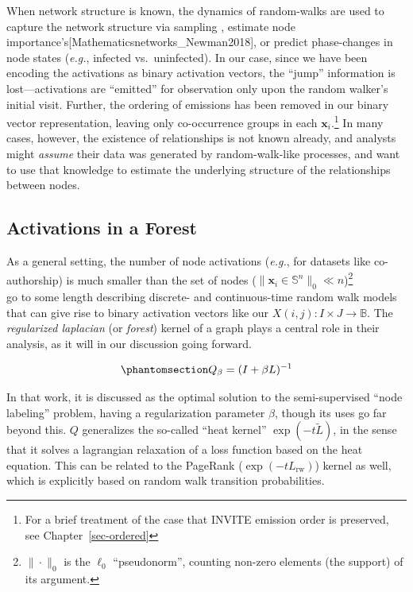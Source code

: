 \documentclass[%
	12pt,
		oneside,
		letterpaper
]{book}
\begin{document}
When network structure is known, the dynamics of random-walks are used
to capture the network structure via sampling
\autocite{LittleBallFur_Rozemberczki2020}, estimate node
importance's{[}Mathematicsnetworks\_Newman2018{]}, or predict
phase-changes in node states (\emph{e.g.}, infected
vs.~uninfected)\autocite{StructureFunctionComplex_Newman2003}. In our
case, since we have been encoding the activations as binary activation
vectors, the ``jump'' information is lost---activations are ``emitted''
for observation only upon the random walker's initial
visit.\autocite{Humanmemorysearch_Jun2015} Further, the ordering of
emissions has been removed in our binary vector representation, leaving
only co-occurrence groups in each \(\mathbf{x}_i\).\footnote{For a brief
  treatment of the case that INVITE emission order is preserved, see
  Chapter~\ref{sec-ordered}} In many cases, however, the existence of
relationships is not known already, and analysts might \emph{assume}
their data was generated by random-walk-like processes, and want to use
that knowledge to estimate the underlying structure of the relationships
between nodes.

\subsection{Activations in a Forest}\label{activations-in-a-forest}

As a general setting, the number of node activations (\emph{e.g.}, for
datasets like co-authorship) is much smaller than the set of nodes
(\(\|\mathbf{x}_i\in\mathbb{S}^n\|_0 \ll n\))\footnote{ \(\|\cdot\|_0\)
  is the \(\ell_0\) ``pseudonorm'', counting non-zero elements (the
  support) of its argument.}\\
\textcite{Semisupervisedlearning_Avrachenkov2017} go to some length
describing discrete- and continuous-time random walk models that can
give rise to binary activation vectors like our
\(X(i,j):I\times J\rightarrow \mathbb{B}\). The \emph{regularized
laplacian} (or \emph{forest}) kernel of a
graph\autocite{SimilaritiesgraphsKernels_Avrachenkov2019} plays a
central role in their analysis, as it will in our discussion going
forward.

\begin{equation}\phantomsection\label{eq-regulap}{
Q_{\beta} = (I+\beta L)^{-1}
}\end{equation}

In that work, it is discussed as the optimal solution to the
semi-supervised ``node labeling'' problem, having a regularization
parameter \(\beta\), though its uses go far beyond
this.\autocite{GraphLaplacianRegularization_Pang2017,Countingrootedforests_Knill2013,MatrixForestTheorem_Chebotarev2006}
\(Q\) generalizes the so-called ``heat kernel'' \(\exp{(-t\tilde{L})}\),
in the sense that it solves a lagrangian relaxation of a loss function
based on the heat equation. This can be related to the PageRank
(\(\exp{(-tL_{\text{rw}})}\)) kernel as well, which is explicitly based
on random walk transition probabilities.
\end{document}
